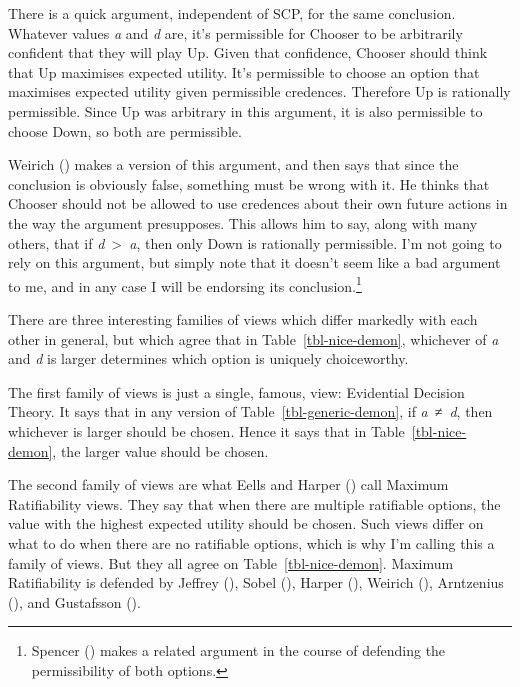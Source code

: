 \documentclass[
  10pt,
  letterpaper,
  DIV=11,
  numbers=noendperiod,
  twoside]{scrartcl}
\begin{document}
There is a quick argument, independent of SCP, for the same conclusion.
Whatever values \emph{a} and \emph{d} are, it's permissible for Chooser
to be arbitrarily confident that they will play Up. Given that
confidence, Chooser should think that Up maximises expected utility.
It's permissible to choose an option that maximises expected utility
given permissible credences. Therefore Up is rationally permissible.
Since Up was arbitrary in this argument, it is also permissible to
choose Down, so both are permissible.

Weirich () makes a version of this
argument, and then says that since the conclusion is obviously false,
something must be wrong with it. He thinks that Chooser should not be
allowed to use credences about their own future actions in the way the
argument presupposes. This allows him to say, along with many others,
that if \emph{d}~\textgreater~\emph{a}, then only Down is rationally
permissible. I'm not going to rely on this argument, but simply note
that it doesn't seem like a bad argument to me, and in any case I will
be endorsing its conclusion.\footnote{Spencer
  () makes a related argument in the
  course of defending the permissibility of both options.}

There are three interesting families of views which differ markedly with
each other in general, but which agree that in
Table~\ref{tbl-nice-demon}, whichever of \emph{a} and \emph{d} is larger
determines which option is uniquely choiceworthy.

The first family of views is just a single, famous, view: Evidential
Decision Theory. It says that in any version of
Table~\ref{tbl-generic-demon}, if \emph{a}~≠~\emph{d}, then whichever is
larger should be chosen. Hence it says that in
Table~\ref{tbl-nice-demon}, the larger value should be chosen.

The second family of views are what Eells and Harper
() call Maximum Ratifiability views.
They say that when there are multiple ratifiable options, the value with
the highest expected utility should be chosen. Such views differ on what
to do when there are no ratifiable options, which is why I'm calling
this a family of views. But they all agree on
Table~\ref{tbl-nice-demon}. Maximum Ratifiability is defended by Jeffrey
(), Sobel
(), Harper
(), Weirich
(), Arntzenius
(), and Gustafsson
().
\end{document}
